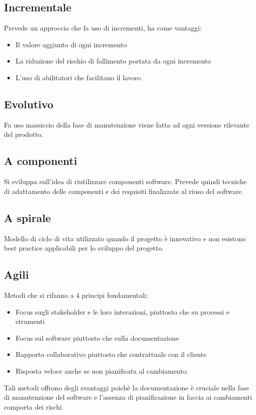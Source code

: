 		\subsection{Incrementale}
			Prevede un approccio che fa uso di incrementi, ha come vantaggi:
			\begin{itemize}  
			\item Il valore aggiunto di ogni incremento 
			\item La riduzione del rischio di fallimento portata da ogni incremento
			\item L'uso di abilitatori che facilitano il lavoro 
			\end{itemize}			
			
		\subsection{Evolutivo}
			Fa uso massiccio della fase di manutenzione viene fatta ad ogni versione rilevante del prodotto.
		
		\subsection{A componenti}
			Si sviluppa sull'idea di riutilizzare componenti software. Prevede quindi tecniche di adattamento delle componenti e dei requisiti finalizzate al riuso del software.
		
		\subsection{A spirale}	
				Modello di ciclo di vita utilizzato quando il progetto è innovativo e non esistono best practice applicabili per lo sviluppo del progetto.
		
		\subsection{Agili}
		Metodi che si rifanno a 4 principi fondamentali:
			\begin{itemize}  
			\item Focus sugli stakeholder e le loro interazioni, piuttosto che su processi e strumenti
			\item Focus sul software piuttosto che sulla documentazione
			\item Rapporto collaborativo piuttosto che contrattuale con il cliente
			\item Risposta veloce anche se non pianificata al cambiamento. 
			\end{itemize}				
		Tali metodi offrono degli svantaggi poichè la documentazione è cruciale nella fase di manutenzione del software e l'assenza di pianificazione in faccia ai cambiamenti comporta dei rischi.
		
